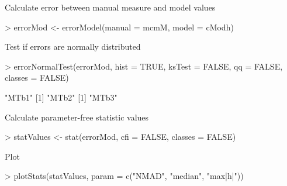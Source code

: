 \documentclass[a4paper]{article}
\begin{document}
Calculate error between manual measure and model values

\begin{Schunk}
\begin{Sinput}
> errorMod <- errorModel(manual = mcmM, model = cModh)
\end{Sinput}
\end{Schunk}

Test if errors are normally distributed
\begin{Schunk}
\begin{Sinput}
> errorNormalTest(errorMod, hist = TRUE, ksTest = FALSE, qq = FALSE, classes = FALSE)
\end{Sinput}
\begin{Soutput}
[1] "MTb1"
[1] "MTb2"
[1] "MTb3"
\end{Soutput}
\end{Schunk}

Calculate parameter-free statistic values
\begin{Schunk}
\begin{Sinput}
> statValues <- stat(errorMod, cfi = FALSE, classes = FALSE)
\end{Sinput}
\end{Schunk}

Plot 

\begin{Schunk}
\begin{Sinput}
> plotStats(statValues, param = c("NMAD", "median", "max|h|"))
\end{Sinput}
\end{Schunk}
\end{document}
